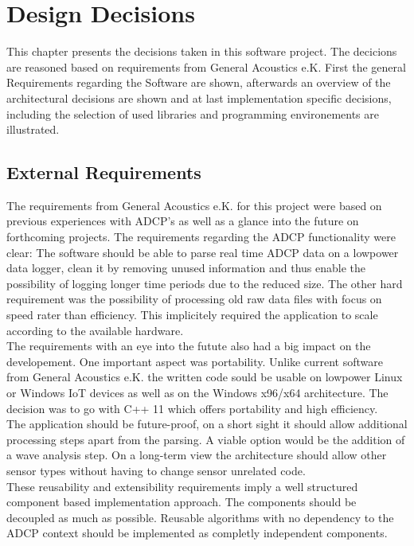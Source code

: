 
\chapter{Design Decisions}
This chapter presents the decisions taken in this software project. The decicions are reasoned based on requirements from General Acoustics e.K. First the general Requirements regarding the Software are shown, afterwards an overview of the architectural decisions are shown and at last implementation specific decisions, including the selection of used libraries and programming environements are illustrated. 
\section{External Requirements}
The requirements from General Acoustics e.K. for this project were based on previous experiences with ADCP's as well as a glance into the future on forthcoming projects. The requirements regarding the ADCP functionality were clear: The software should be able to parse real time ADCP data on a lowpower data logger, clean it by removing unused information and thus enable the possibility of logging longer time periods due to the reduced size. The other hard requirement was the possibility of processing old raw data files with focus on speed rater than efficiency. This implicitely required the application to scale according to the available hardware.\\ The requirements with an eye into the futute also had a big impact on the developement. One important aspect was portability. Unlike current software from General Acoustics e.K. the written code sould be usable on lowpower Linux or Windows IoT devices as well as on the Windows x96/x64 architecture. The decision was to go with C++ 11 which offers portability and high efficiency.\\
The application should be future-proof, on a short sight it should allow additional processing steps apart from the parsing. A viable option would be the addition of a wave analysis step. On a long-term view the architecture should allow other sensor types without having to change sensor unrelated code.\\ 
These reusability and extensibility requirements imply a well structured component based implementation approach. The components should be decoupled as much as possible. Reusable algorithms with no dependency to the ADCP context should be implemented as completly independent components.\\
